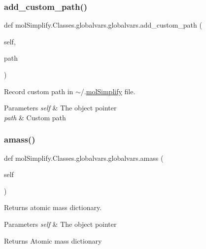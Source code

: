 \subsubsection{\texorpdfstring{add\+\_\+custom\+\_\+path()}{add\_custom\_path()}}
{\footnotesize\ttfamily def mol\+Simplify.\+Classes.\+globalvars.\+globalvars.\+add\+\_\+custom\+\_\+path (\begin{DoxyParamCaption}\item[{}]{self,  }\item[{}]{path }\end{DoxyParamCaption})}



Record custom path in $\sim$/.\hyperlink{namespacemolSimplify}{mol\+Simplify} file. 


\begin{DoxyParams}{Parameters}
{\em self} & The object pointer \\
\hline
{\em path} & Custom path \\
\hline
\end{DoxyParams}
\mbox{\label{classmolSimplify_1_1Classes_1_1globalvars_1_1globalvars_a3445aa2f86c723616f75e37c9fb8e648}} 
\subsubsection{\texorpdfstring{amass()}{amass()}}
{\footnotesize\ttfamily def mol\+Simplify.\+Classes.\+globalvars.\+globalvars.\+amass (\begin{DoxyParamCaption}\item[{}]{self }\end{DoxyParamCaption})}



Returns atomic mass dictionary. 


\begin{DoxyParams}{Parameters}
{\em self} & The object pointer \\
\hline
\end{DoxyParams}
\begin{DoxyReturn}{Returns}
Atomic mass dictionary 
\end{DoxyReturn}
\mbox{\label{classmolSimplify_1_1Classes_1_1globalvars_1_1globalvars_ab41702f904534cee14aaca1eeaec3ccd}} 
